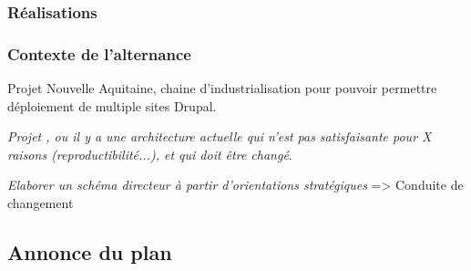 \subsubsection{Réalisations}

\subsubsection{Contexte de l'alternance}

Projet Nouvelle Aquitaine, chaine d'industrialisation pour pouvoir permettre déploiement de multiple sites Drupal.

\textit{Projet \bv{}, ou il y a une architecture actuelle qui n'est pas satisfaisante pour X raisons (reproductibilité...), et qui doit être changé}.

\textit{Elaborer un schéma directeur à partir d’orientations stratégiques} => Conduite de changement


\subsection{Annonce du plan}